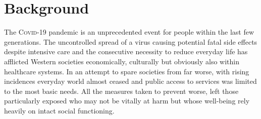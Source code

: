 \documentclass{bmcart}
\begin{document}
\begin{frontmatter}
\begin{abstractbox}
			\begin{keyword}				%
			\end{keyword}
			
			
		\end{abstractbox}
		
	\end{frontmatter}
	
	
		

\section*{Background}
	The \textsc{Covid}-19 pandemic is an unprecedented event for people within the last few generations. The uncontrolled spread of a virus causing potential fatal side effects despite intensive care and the consecutive necessity to reduce everyday life has afflicted Western societies economically, culturally but obviously also within healthcare systems. In an attempt to spare societies from far worse, with rising incidences everyday world almost ceased and public access to services was limited to the most basic needs. All the measures taken to prevent worse, left those particularly exposed who may not be vitally at harm but whose well-being rely heavily on intact social functioning.
\end{document}
